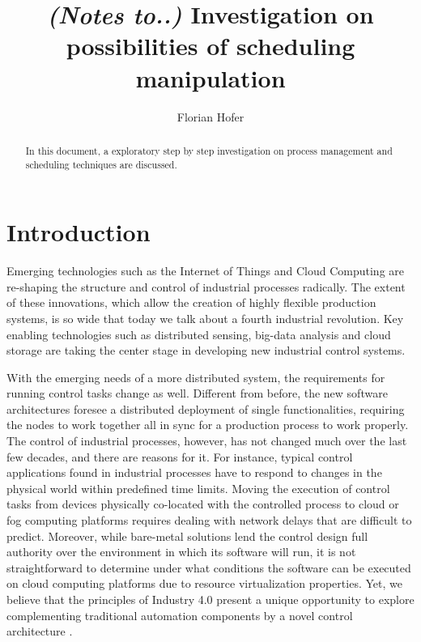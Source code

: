 \documentclass[]{scrartcl}
\title{\textit{(Notes to..) } Investigation on possibilities of scheduling manipulation}
\author{Florian Hofer}
\begin{document}
\maketitle

\begin{abstract}
In this document, a exploratory step by step investigation on process management and scheduling techniques are discussed.
\end{abstract}

\section{Introduction}


Emerging technologies such as the Internet of Things and Cloud Computing are re-shaping the structure and control of industrial processes radically. 
The extent of these innovations, which allow the creation of highly flexible production systems, is so wide that today we talk about a fourth industrial revolution.
Key enabling technologies such as distributed sensing, big-data analysis and cloud storage are taking the center stage in developing new industrial control systems.

With the emerging needs of a more distributed system, the requirements for running control tasks change as well.
Different from before, the new software architectures foresee a distributed deployment of single functionalities, requiring the nodes to work together all in sync for a production process to work properly. 
%
The control of industrial processes, however, has not changed much over the last few decades, and there are reasons for it.
For instance, typical control applications found in industrial processes have to respond to changes in the physical world within predefined time limits.
Moving the execution of control tasks from devices physically co-located with the controlled process to cloud or fog computing platforms requires dealing with network delays that are difficult to predict.
Moreover, while bare-metal solutions lend the control design full authority over the environment in which its software will run, it is not straightforward to determine under what conditions the software can be executed on cloud computing platforms due to resource virtualization properties.
Yet, we believe that the principles of Industry 4.0 present a unique opportunity to explore complementing traditional automation components by a novel control architecture \cite{Tascietal2018}.
\end{document}
